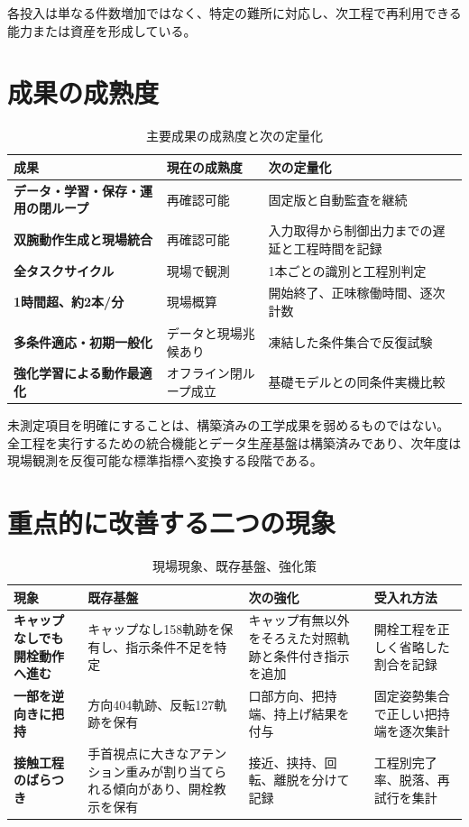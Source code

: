 各投入は単なる件数増加ではなく、特定の難所に対応し、次工程で再利用できる能力または資産を形成している。

\section{成果の成熟度}

\begin{table}[H]
\centering
\caption{主要成果の成熟度と次の定量化}
\begin{tabularx}{\textwidth}{>{\bfseries}p{48mm}p{31mm}X}
\toprule
成果 & 現在の成熟度 & 次の定量化\\
\midrule
データ・学習・保存・運用の閉ループ & 再確認可能 & 固定版と自動監査を継続\\
双腕動作生成と現場統合 & 再確認可能 & 入力取得から制御出力までの遅延と工程時間を記録\\
全タスクサイクル & 現場で観測 & 1本ごとの識別と工程別判定\\
1時間超、約2本/分 & 現場概算 & 開始終了、正味稼働時間、逐次計数\\
多条件適応・初期一般化 & データと現場兆候あり & 凍結した条件集合で反復試験\\
強化学習による動作最適化 & オフライン閉ループ成立 & 基礎モデルとの同条件実機比較\\
\bottomrule
\end{tabularx}
\end{table}

未測定項目を明確にすることは、構築済みの工学成果を弱めるものではない。全工程を実行するための統合機能とデータ生産基盤は構築済みであり、次年度は現場観測を反復可能な標準指標へ変換する段階である。

\section{重点的に改善する二つの現象}

\begin{table}[H]
\centering
\caption{現場現象、既存基盤、強化策}
\begin{tabularx}{\textwidth}{>{\bfseries}p{31mm}p{45mm}p{45mm}X}
\toprule
現象 & 既存基盤 & 次の強化 & 受入れ方法\\
\midrule
キャップなしでも開栓動作へ進む & キャップなし158軌跡を保有し、指示条件不足を特定 & キャップ有無以外をそろえた対照軌跡と条件付き指示を追加 & 開栓工程を正しく省略した割合を記録\\
一部を逆向きに把持 & 方向404軌跡、反転127軌跡を保有 & 口部方向、把持端、持上げ結果を付与 & 固定姿勢集合で正しい把持端を逐次集計\\
接触工程のばらつき & 手首視点に大きなアテンション重みが割り当てられる傾向があり、開栓教示を保有 & 接近、挟持、回転、離脱を分けて記録 & 工程別完了率、脱落、再試行を集計\\
\bottomrule
\end{tabularx}
\end{table}

